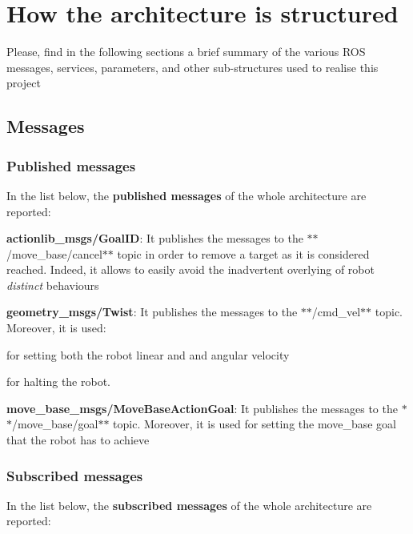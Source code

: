 \section*{How the architecture is structured}

Please, find in the following sections a brief summary of the various R\+OS messages, services, parameters, and other sub-\/structures used to realise this project

\subsection*{Messages}

\subsubsection*{Published messages}

In the list below, the {\bfseries published messages} of the whole architecture are reported\+:


\begin{DoxyItemize}
\item {\bfseries actionlib\+\_\+msgs/\+Goal\+ID}\+: It publishes the messages to the $\ast$$\ast$/move\+\_\+base/cancel$\ast$$\ast$ topic in order to remove a target as it is considered reached. Indeed, it allows to easily avoid the inadvertent overlying of robot {\itshape distinct} behaviours
\item {\bfseries geometry\+\_\+msgs/\+Twist}\+: It publishes the messages to the $\ast$$\ast$/cmd\+\_\+vel$\ast$$\ast$ topic. Moreover, it is used\+:
\begin{DoxyEnumerate}
\item for setting both the robot linear and and angular velocity
\item for halting the robot.
\end{DoxyEnumerate}
\item {\bfseries move\+\_\+base\+\_\+msgs/\+Move\+Base\+Action\+Goal}\+: It publishes the messages to the $\ast$$\ast$/move\+\_\+base/goal$\ast$$\ast$ topic. Moreover, it is used for setting the move\+\_\+base goal that the robot has to achieve
\end{DoxyItemize}

\subsubsection*{Subscribed messages}

In the list below, the {\bfseries subscribed messages} of the whole architecture are reported\+:


